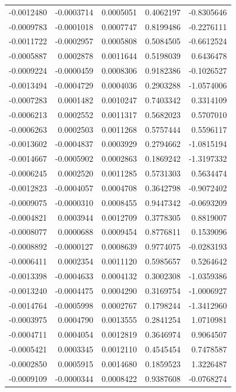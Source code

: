 \documentclass[]{tufte-handout}
\begin{document}
\begin{longtable}[]{@{}rrrrr@{}}
-0.0012480 & -0.0003714 & 0.0005051 & 0.4062197 & -0.8305646 \\
-0.0009783 & -0.0001018 & 0.0007747 & 0.8199486 & -0.2276111 \\
-0.0011722 & -0.0002957 & 0.0005808 & 0.5084505 & -0.6612524 \\
-0.0005887 & 0.0002878 & 0.0011644 & 0.5198039 & 0.6436478 \\
-0.0009224 & -0.0000459 & 0.0008306 & 0.9182386 & -0.1026527 \\
-0.0013494 & -0.0004729 & 0.0004036 & 0.2903288 & -1.0574006 \\
-0.0007283 & 0.0001482 & 0.0010247 & 0.7403342 & 0.3314109 \\
-0.0006213 & 0.0002552 & 0.0011317 & 0.5682023 & 0.5707010 \\
-0.0006263 & 0.0002503 & 0.0011268 & 0.5757444 & 0.5596117 \\
-0.0013602 & -0.0004837 & 0.0003929 & 0.2794662 & -1.0815194 \\
-0.0014667 & -0.0005902 & 0.0002863 & 0.1869242 & -1.3197332 \\
-0.0006245 & 0.0002520 & 0.0011285 & 0.5731303 & 0.5634474 \\
-0.0012823 & -0.0004057 & 0.0004708 & 0.3642798 & -0.9072402 \\
-0.0009075 & -0.0000310 & 0.0008455 & 0.9447342 & -0.0693209 \\
-0.0004821 & 0.0003944 & 0.0012709 & 0.3778305 & 0.8819007 \\
-0.0008077 & 0.0000688 & 0.0009454 & 0.8776811 & 0.1539096 \\
-0.0008892 & -0.0000127 & 0.0008639 & 0.9774075 & -0.0283193 \\
-0.0006411 & 0.0002354 & 0.0011120 & 0.5985657 & 0.5264642 \\
-0.0013398 & -0.0004633 & 0.0004132 & 0.3002308 & -1.0359386 \\
-0.0013240 & -0.0004475 & 0.0004290 & 0.3169754 & -1.0006927 \\
-0.0014764 & -0.0005998 & 0.0002767 & 0.1798244 & -1.3412960 \\
-0.0003975 & 0.0004790 & 0.0013555 & 0.2841254 & 1.0710981 \\
-0.0004711 & 0.0004054 & 0.0012819 & 0.3646974 & 0.9064507 \\
-0.0005421 & 0.0003345 & 0.0012110 & 0.4545454 & 0.7478587 \\
-0.0002850 & 0.0005915 & 0.0014680 & 0.1859523 & 1.3226487 \\
-0.0009109 & -0.0000344 & 0.0008422 & 0.9387608 & -0.0768274 \\

\end{longtable}
\end{document}
